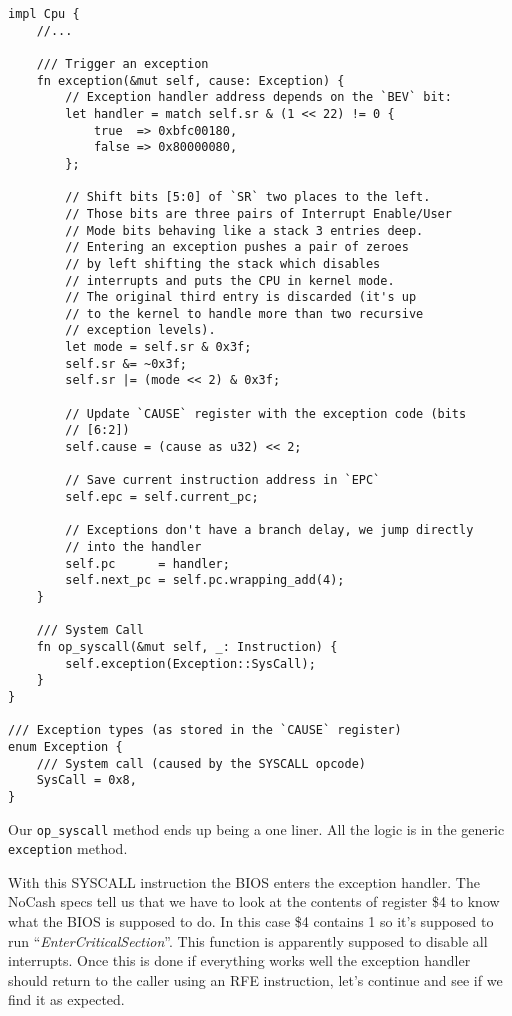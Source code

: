 \documentclass[a4paper]{article}
\newcommand{\code}[1] {\texttt{#1}}
\begin{document}
\begin{lstlisting}
impl Cpu {
    //...

    /// Trigger an exception
    fn exception(&mut self, cause: Exception) {
        // Exception handler address depends on the `BEV` bit:
        let handler = match self.sr & (1 << 22) != 0 {
            true  => 0xbfc00180,
            false => 0x80000080,
        };

        // Shift bits [5:0] of `SR` two places to the left.
        // Those bits are three pairs of Interrupt Enable/User
        // Mode bits behaving like a stack 3 entries deep.
        // Entering an exception pushes a pair of zeroes
        // by left shifting the stack which disables
        // interrupts and puts the CPU in kernel mode.
        // The original third entry is discarded (it's up
        // to the kernel to handle more than two recursive
        // exception levels).
        let mode = self.sr & 0x3f;
        self.sr &= ~0x3f;
        self.sr |= (mode << 2) & 0x3f;

        // Update `CAUSE` register with the exception code (bits
        // [6:2])
        self.cause = (cause as u32) << 2;

        // Save current instruction address in `EPC`
        self.epc = self.current_pc;

        // Exceptions don't have a branch delay, we jump directly
        // into the handler
        self.pc      = handler;
        self.next_pc = self.pc.wrapping_add(4);
    }

    /// System Call
    fn op_syscall(&mut self, _: Instruction) {
        self.exception(Exception::SysCall);
    }
}

/// Exception types (as stored in the `CAUSE` register)
enum Exception {
    /// System call (caused by the SYSCALL opcode)
    SysCall = 0x8,
}
\end{lstlisting}

Our \code{op\_syscall} method ends up being a one liner. All the logic
is in the generic \code{exception} method.

With this SYSCALL instruction the BIOS enters the exception
handler. The NoCash specs tell us that we have to look at the contents
of register \$4 to know what the BIOS is supposed to do. In this case
\$4 contains 1 so it's supposed to run
``\textit{EnterCriticalSection}''. This function is apparently
supposed to disable all interrupts. Once this is done if everything
works well the exception handler should return to the caller using an
RFE instruction, let's continue and see if we find it as expected.
\end{document}
